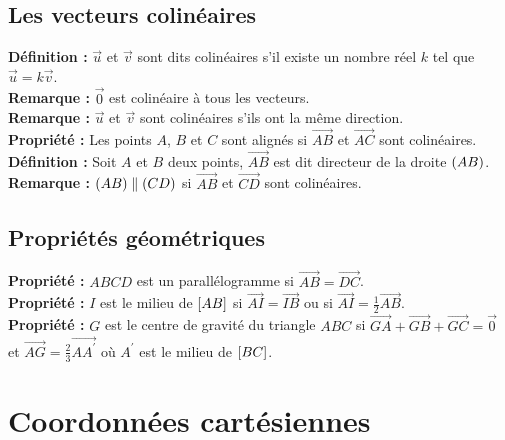 \documentclass[a4paper,titlepage]{article}
\let\oldsection\section
\renewcommand\section{\clearpage\oldsection}
\let\oldleft\left
\renewcommand{\left}{\mathopen{}\mathclose\bgroup\oldleft}
\let\oldright\right
\renewcommand{\right}{\aftergroup\egroup\oldright}
\begin{document}
    \subsection{Les vecteurs colinéaires}
        \textbf{Définition :} $\vec{u}$ et $\vec{v}$ sont dits colinéaires s’il existe un nombre réel $k$ tel que $\vec{u}=k\vec{v}$.
        \\
        \textbf{Remarque :} $\overrightarrow{0}$ est colinéaire à tous les vecteurs.
        \\
        \textbf{Remarque :} $\vec{u}$ et $\vec{v}$ sont colinéaires s’ils ont la même direction.
        \\
        \textbf{Propriété :} Les points $A$, $B$ et $C$ sont alignés si $\overrightarrow{AB}$ et $\overrightarrow{AC}$ sont colinéaires.
        \\
        \textbf{Définition :} Soit $A$ et $B$ deux points, $\overrightarrow{AB}$ est dit directeur de la droite $\left(AB\right)$.
        \\
        \textbf{Remarque :} $\left(AB\right)\parallel\left(CD\right)$ si $\overrightarrow{AB}$ et $\overrightarrow{CD}$ sont colinéaires.
    \subsection{Propriétés géométriques}
        \textbf{Propriété :} $ABCD$ est un parallélogramme si $\overrightarrow{AB}=\overrightarrow{DC}$.
        \\
        \textbf{Propriété :} $I$ est le milieu de $\left[AB\right]$ si $\overrightarrow{AI}=\overrightarrow{IB}$ ou si $\overrightarrow{AI}=\frac{1}{2}\overrightarrow{AB}$.
        \\
        \textbf{Propriété :} $G$ est le centre de gravité du triangle $ABC$ si $\overrightarrow{GA}+\overrightarrow{GB}+\overrightarrow{GC}=\overrightarrow{0}$ et $\overrightarrow{AG}=\frac{2}{3}\overrightarrow{AA^{\prime}}$ où $A^{\prime}$ est le milieu de $\left[BC\right]$.
\section{Coordonnées cartésiennes}
\end{document}
